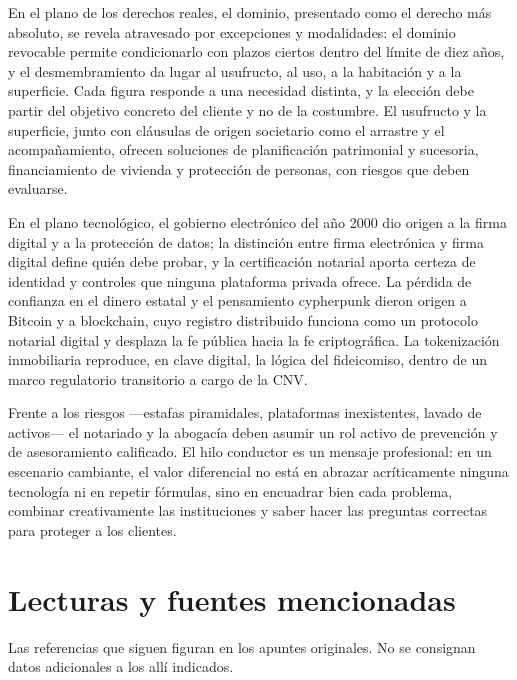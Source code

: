 \documentclass[12pt,oneside]{book}
\begin{document}
En el plano de los derechos reales, el dominio, presentado como el derecho más absoluto, se revela atravesado por excepciones y modalidades: el dominio revocable permite condicionarlo con plazos ciertos dentro del límite de diez años, y el desmembramiento da lugar al usufructo, al uso, a la habitación y a la superficie. Cada figura responde a una necesidad distinta, y la elección debe partir del objetivo concreto del cliente y no de la costumbre. El usufructo y la superficie, junto con cláusulas de origen societario como el arrastre y el acompañamiento, ofrecen soluciones de planificación patrimonial y sucesoria, financiamiento de vivienda y protección de personas, con riesgos que deben evaluarse.

En el plano tecnológico, el gobierno electrónico del año 2000 dio origen a la firma digital y a la protección de datos; la distinción entre firma electrónica y firma digital define quién debe probar, y la certificación notarial aporta certeza de identidad y controles que ninguna plataforma privada ofrece. La pérdida de confianza en el dinero estatal y el pensamiento cypherpunk dieron origen a Bitcoin y a blockchain, cuyo registro distribuido funciona como un protocolo notarial digital y desplaza la fe pública hacia la fe criptográfica. La tokenización inmobiliaria reproduce, en clave digital, la lógica del fideicomiso, dentro de un marco regulatorio transitorio a cargo de la CNV.

Frente a los riesgos ---estafas piramidales, plataformas inexistentes, lavado de activos--- el notariado y la abogacía deben asumir un rol activo de prevención y de asesoramiento calificado. El hilo conductor es un mensaje profesional: en un escenario cambiante, el valor diferencial no está en abrazar acríticamente ninguna tecnología ni en repetir fórmulas, sino en encuadrar bien cada problema, combinar creativamente las instituciones y saber hacer las preguntas correctas para proteger a los clientes.

\chapter*{Lecturas y fuentes mencionadas}

Las referencias que siguen figuran en los apuntes originales. No se consignan datos adicionales a los allí indicados.
\end{document}
